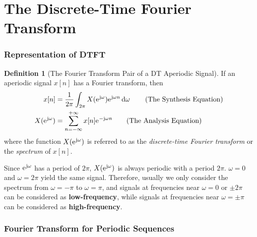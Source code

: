 \documentclass[10pt,UTF8]{article}
\newenvironment{definition box}
{\begin{tcolorbox}[colback=blue!5!white,colframe=blue!75!black,parbox=false,before upper=\par,before lower=\par]}
{\end{tcolorbox}}
\newenvironment{theorem box}
{\begin{tcolorbox}[colback=yellow!5!white,colframe=yellow!75!black,parbox=false,before upper=\par,before lower=\par]}
{\end{tcolorbox}}
\theoremstyle{definition}
\newtheorem{definition inner}{Definition}[section]
\newenvironment{definition}[1][]
{\begin{definition box}\begin{definition inner}[#1]\hfill\par}
{\end{definition inner}\end{definition box}}
\theoremstyle{plain}
\newtheorem{theorem inner}{Theorem}[section]
\theoremstyle{definition}
\newtheorem*{proof inner}{\textit{Proof}}
\theoremstyle{remark}
\newcommand{\ju}{\mathrm{j}}  %
\newcommand{\e}{\mathrm{e}{\mkern 1 mu}}
\begin{document}
\part*{The Discrete-Time Fourier Transform}

\section{Representation of DTFT}


\begin{definition}[The Fourier Transform Pair of a DT Aperiodic Signal]
    If an aperiodic signal $x[n]$ has a Fourier transform, then
    \begin{align*}
        x[n] &=
        \frac{1}{2\pi}\int_{2\pi}
        X(\e^{\ju\omega})\e^{\ju\omega n}\dd{\omega}
        \tag{The Synthesis Equation} \\
        X(\e^{\ju\omega}) &=
        \sum_{n=-\infty}^{+\infty}x[n]\e^{-\ju\omega n}
        \tag{The Analysis Equation}
    \end{align*}
    where the function $X(\e^{\ju\omega})$ is referred to as
    the \emph{discrete-time Fourier transform} or the \emph{spectrum} of $x[n]$.
\end{definition}

Since $\e^{\ju\omega}$ has a period of $2\pi$,
$X(\e^{\ju\omega})$ is always periodic with a period $2\pi$.
$\omega=0$ and $\omega=2\pi$ yield the same signal.
Therefore, usually we only consider the spectrum from $\omega=-\pi$ to $\omega=\pi$,
and signals at frequencies near $\omega=0$ or $\pm 2\pi$ can be considered as
\textbf{low-frequency}, while signals at frequencies near $\omega=\pm\pi$
can be considered as \textbf{high-frequency}.

\section{Fourier Transform for Periodic Sequences}
\end{document}
